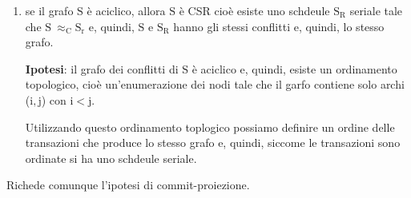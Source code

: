 \begin{itemize}[label=$\diamond$, itemsep=\smallskipamount]
{\begin{enumerate}[itemsep=\medskipamount]
            Siccome $\mathrm{S \ \approx_C S_r}$, allora hanno lo stesso grafo dei conflitti e, quindi, anche il grafo dei conflitti di $\mathrm{S}$ è aciclico.
            \item se il grafo $\mathrm{S}$ è aciclico, allora $\mathrm{S}$ è CSR cioè esiste uno schdeule $\mathrm{S_R}$ seriale tale che $\mathrm{S \ \approx_C S_r}$ e, quindi, $\mathrm{S}$ e $\mathrm{S_R}$ hanno gli stessi conflitti e, quindi, lo stesso grafo.
            
            \smallskip
            \textbf{Ipotesi}: il grafo dei conflitti di $\mathrm{S}$ è aciclico e, quindi, esiste un ordinamento topologico, cioè un'enumerazione dei nodi tale che il garfo contiene solo archi ($\mathrm{i, j}$) con $\mathrm{i < j}$.

            Utilizzando questo ordinamento toplogico possiamo definire un ordine delle transazioni che produce lo stesso grafo e, quindi, siccome le transazioni sono ordinate si ha uno schdeule seriale.
        \end{enumerate}
    }
\end{itemize}

Richede comunque l'ipotesi di commit-proiezione.


